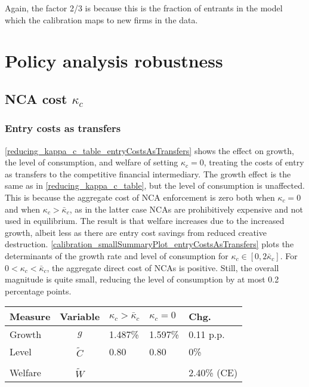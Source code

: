 \documentclass[11pt,english]{article}
\theoremstyle{definition}
\begin{document}
Again, the factor 2/3 is because this is the fraction of entrants in the model which the calibration maps to new firms in the data.

\section{Policy analysis robustness}

\subsection{NCA cost $\kappa_c$}\label{appendix:policyanalysis:ncacost}

\subsubsection{Entry costs as transfers}

\autoref{reducing_kappa_c_table_entryCostsAsTransfers} shows the effect on growth, the level of consumption, and welfare of setting $\kappa_c = 0$, treating the costs of entry as transfers to the competitive financial intermediary. The growth effect is the same as in \autoref{reducing_kappa_c_table}, but the level of consumption is unaffected. This is because the aggregate cost of NCA enforcement is zero both when $\kappa_c = 0$ and when $\kappa_c > \bar{\kappa}_c$, as in the latter case NCAs are prohibitively expensive and not used in equilibrium. The result is that welfare increases due to the increased growth, albeit less as there are entry cost savings from reduced creative destruction. \autoref{calibration_smallSummaryPlot_entryCostsAsTransfers} plots the determinants of the growth rate and level of consumption for $\kappa_c \in [0, 2\bar{\kappa}_c]$. For $0 < \kappa_c < \bar{\kappa}_c$, the aggregate direct cost of NCAs is positive. Still, the overall magnitude is quite small, reducing the level of consumption by at most 0.2 percentage points.

\begin{table}
	\centering
	\label{reducing_kappa_c_table_entryCostsAsTransfers}
	\begin{tabular}{lclll}
		\toprule \toprule
		Measure & Variable & $\kappa_c > \bar{\kappa}_c$ & $\kappa_c = 0$ & Chg. \tabularnewline
		\midrule
		Growth & $g$ & 1.487\% & 1.597\% & 0.11 p.p. \tabularnewline
		Level & $\tilde{C}$  & 0.80 &  0.80 & 0\% \tabularnewline 
		\tabularnewline
		Welfare & $\tilde{W}$  &  & & 2.40\% (CE)  \tabularnewline
		\bottomrule
	\end{tabular}
\end{table}
\end{document}
